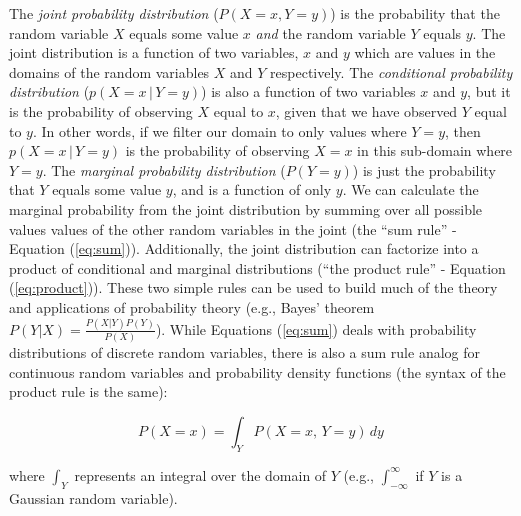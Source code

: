 \documentclass[12pt]{article}
\begin{document}
The \textit{joint probability distribution} ($P(X=x,Y=y)$) is the
probability that the random variable $X$ equals some value $x$ \emph{and} the
random variable $Y$ equals $y$. The joint distribution is a function
of two variables, $x$ and $y$ which are values in the domains of the
random variables $X$ and $Y$ respectively. The \textit{conditional
  probability distribution} ($p(X = x \, | \, Y=y )$) is also a
function of two variables $x$ and $y$, but it is the probability of
observing $X$ equal to $x$, given that we have observed $Y$ equal to
$y$. In other words, if we filter our domain to only values where
$Y=y$, then $p(X = x \, | \, Y=y )$ is the probability of
observing $X=x$ in this sub-domain where $Y=y$. The \textit{marginal
  probability distribution} ($P(Y=y)$) is just the probability that
$Y$ equals some value $y$, and is a function of only $y$. We can
calculate the marginal probability from the joint distribution by
summing over all possible values values of the other random variables
in the joint (the ``sum rule'' - Equation (\ref{eq:sum})). Additionally,
the joint distribution can factorize into a product of conditional and
marginal distributions (``the product rule'' - Equation
(\ref{eq:product})). These two simple rules can be used to build much of the
theory and applications of probability theory (e.g., Bayes' theorem
$P(Y|X) =\frac{P(X|Y) P(Y)}{P(X)}$). While Equations (\ref{eq:sum})
deals with probability distributions of discrete random variables,
there is also a sum rule analog for continuous random variables and
probability density functions (the syntax of the product rule is the
same):

\begin{equation*}
  P(X=x) = \int_Y P(X=x,\, Y=y) \, dy
\end{equation*}

where $\int_{Y}$ represents an integral over the domain of $Y$ (e.g.,
$\int_{-\infty}^{\infty}$ if $Y$ is a Gaussian random variable).
\end{document}

